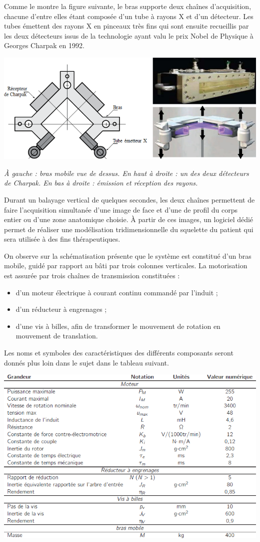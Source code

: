 \documentclass[10pt,fleqn]{article} %
\begin{document}
Comme le montre la figure suivante, le bras supporte deux chaînes d’acquisition, chacune d’entre elles étant composée d’un tube à rayons X et d’un détecteur. Les tubes émettent des rayons X en pinceaux très fins qui sont ensuite recueillis par les deux détecteurs issus de la technologie ayant valu le prix Nobel de Physique à Georges Charpak en 1992.

\begin{center}
\includegraphics[width=.8\linewidth]{images_01/fig_02}

\textit{À gauche : bras mobile  vue de dessus. En haut à droite : un des deux détecteurs de Charpak. En bas à droite : émission et réception des rayons.}
\end{center}




Durant un balayage vertical de quelques secondes, les deux chaînes permettent de faire l’acquisition simultanée d’une image de face et d’une de profil du corps entier ou d’une zone anatomique choisie. À partir de ces images, un logiciel dédié permet de réaliser une modélisation tridimensionnelle du squelette du patient qui sera utilisée à des fins thérapeutiques.

On observe sur la schématisation présente que le système est constitué d’un bras mobile, guidé par rapport au bâti par trois colonnes verticales. La motorisation est assurée par trois chaînes de transmission constituées :
\begin{itemize}
\item d’un moteur électrique à courant continu commandé par l’induit ;
\item d’un réducteur à engrenages ;
\item d’une vis à billes, afin de transformer le mouvement  de rotation en mouvement  de translation.
\end{itemize}
Les noms et symboles des caractéristiques des différents composants seront donnés plus loin dans le sujet dans le tableau suivant.

\begin{center}
\includegraphics[width=.8\linewidth]{images_01/fig_04}
\end{center}
\end{document}

